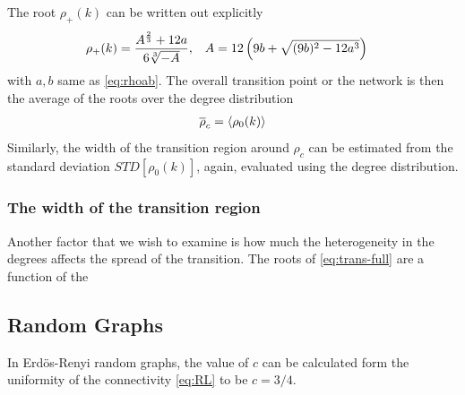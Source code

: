 \documentclass[11pt]{article}
\newcommand{\outNim}[1]{}
\begin{document}
The root $\rho_+(k)$ can be written out explicitly
\begin{align}
    \rho_+(k) %
    &=\frac{A^{\frac{2}{3}} + 12 a}{6 \sqrt[3]{- A}}, &
    A& = 12 \pr{9 b + \sqrt{(9b)^{2}- 12 a^{3} }}
    \label{eq:trans-rc-full}
\end{align}
with $a,b$ same as \eqref{eq:rhoab}. 
The overall transition point or the network is then the average of the roots over the degree distribution
\begin{align}
    \overline{\rho}_c = \left<\rho_0(k)\right>
\end{align}
Similarly, the width of the transition region around $\rho_c$ can be estimated from the standard deviation $STD[\rho_0(k)]$, again, evaluated using the degree distribution.



\subsubsection{The width of the transition region}
Another factor that we wish to examine is how much the heterogeneity in the degrees affects the spread of the transition. 
The roots of \eqref{eq:trans-full} are a function of the 




\subsection{Random Graphs}
In Erd\"os-Renyi random graphs, the value of $c$ can be calculated form the uniformity of the connectivity \eqref{eq:RL} to be $c=3/4$. 


\outNim{
\subsubsection{General Comparison of Conditions}
We wish to find out which of the following two conditions occurs at smaller $r_L/r_N$ ratio: 1) total node volume becomes comparable to leading term of link volumes; 2) link exclusion volume becomes considerable. 
}
\end{document}
